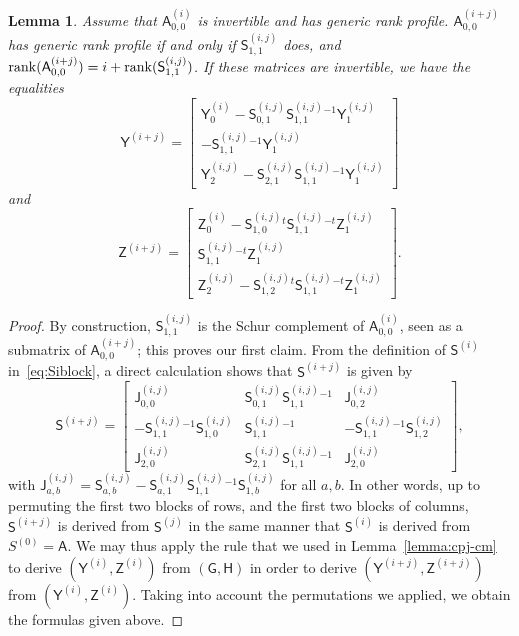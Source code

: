 \documentclass{sig-alternate}
\newcommand{\mA}{\ensuremath{\mathsf{A}}}
\newcommand{\mG}{\ensuremath{\mathsf{G}}}
\newcommand{\mH}{\ensuremath{\mathsf{H}}}
\newcommand{\mJ}{\ensuremath{\mathsf{J}}}
\newcommand{\mS}{\ensuremath{\mathsf{S}}}
\newcommand{\mY}{\ensuremath{\mathsf{Y}}}
\newcommand{\mZ}{\ensuremath{\mathsf{Z}}}
\newtheorem{lemma}[definition]{Lemma}
\begin{document}
\begin{lemma}\label{lemma:update}
  Assume that $\mA^{(i)}_{0,0}$ is invertible and has generic rank
  profile.
  $\mA^{(i+j)}_{0,0}$ has generic rank profile if and only if
  $\mS^{(i,j)}_{1,1}$ does, and
  ${\rm rank}(\mA^{(i+j)}_{0,0})=i+{\rm rank}(\mS^{(i,j)}_{1,1})$.  If
  these matrices are invertible, we have the equalities
  $$
  \mY^{(i+j)} =\left [ \begin{matrix}
      \mY^{(i)}_0 -  \mS^{(i,j)}_{0,1} \mS^{(i,j)}_{1,1}{}^{-1} \mY^{(i,j)}_1\\[1mm]
      - \mS^{(i,j)}_{1,1}{}^{-1} \mY^{(i,j)}_1\\[1mm]
      \mY^{(i,j)}_2 - \mS^{(i,j)}_{2,1} \mS^{(i,j)}_{1,1}{}^{-1}
      \mY^{(i,j)}_1
    \end{matrix}\right ]
  $$
  and
  $$
  \mZ^{(i+j)} =\left [ \begin{matrix}
      \mZ^{(i)}_0 - \mS^{(i,j)}_{1,0}{}^t \mS^{(i,j)}_{1,1}{}^{-t} \mZ^{(i,j)}_1\\[1mm]
      \mS^{(i,j)}_{1,1}{}^{-t} \mZ^{(i,j)}_1\\[1mm]
      \mZ^{(i,j)}_2 - \mS^{(i,j)}_{1,2}{}^t \mS^{(i,j)}_{1,1}{}^{-t}
      \mZ^{(i,j)}_1
  \end{matrix}\right ].$$
\end{lemma}
\begin{proof}
  By construction, $\mS^{(i,j)}_{1,1}$ is the Schur complement of ${\mA^{(i)}_{0,0}}$,
  seen as a submatrix of $\mA^{(i+j)}_{0,0}$; this proves our first claim. From the definition of
  $\mS^{(i)}$ in~\eqref{eq:Siblock}, a direct calculation shows that $\mS^{(i+j)}$
  is given by
$$\mS^{(i+j)} = \left [ \begin{matrix} 
\mJ^{(i,j)}_{0,0} &
         \mS^{(i,j)}_{0,1}\mS^{(i,j)}_{1,1}{}^{-1} &
         \mJ^{(i,j)}_{0,2} \\
-\mS^{(i,j)}_{1,1}{}^{-1}\mS^{(i,j)}_{1,0} & 
         \mS^{(i,j)}_{1,1}{}^{-1} &
        -\mS^{(i,j)}_{1,1}{}^{-1} \mS^{(i,j)}_{1,2}\\ 
\mJ^{(i,j)}_{2,0} &
         \mS^{(i,j)}_{2,1}\mS^{(i,j)}_{1,1}{}^{-1} & 
\mJ^{(i,j)}_{2,0} 
    \end{matrix}\right ],$$
with $\mJ^{(i,j)}_{a,b}=\mS^{(i,j)}_{a,b} -\mS^{(i,j)}_{a,1} \mS^{(i,j)}_{1,1}{}^{-1}\mS^{(i,j)}_{1,b}$
for all $a,b$.
In other words, up to permuting the first two blocks of rows, and the
first two blocks of columns, $\mS^{(i+j)}$ is derived from $\mS^{(j)}$ in
the same manner that $\mS^{(i)}$ is derived from $S^{(0)}=\mA$. We may thus apply
the rule that we used in Lemma~\ref{lemma:cpj-cm} to derive
$(\mY^{(i)},\mZ^{(i)})$ from $(\mG,\mH)$ in order to derive
$(\mY^{(i+j)},\mZ^{(i+j)})$ from $(\mY^{(i)},\mZ^{(i)})$.  Taking into account the
permutations we applied, we obtain the formulas given above.
\end{proof}
\end{document}
